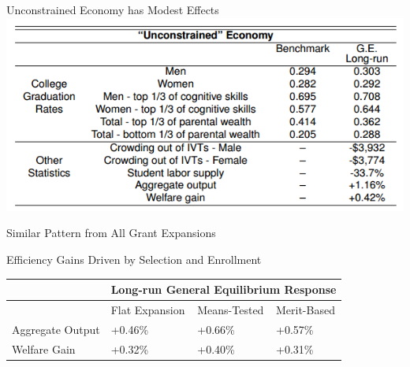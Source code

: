 \documentclass{beamer}
\begin{document}
\begin{frame}{Unconstrained Economy has Modest Effects}
\includegraphics[width=\textwidth]{unconstrained.png}
\end{frame}

\begin{frame}{Similar Pattern from All Grant Expansions}
\begin{table}[]
\centering
{}
\end{table}
\end{frame}

\begin{frame}{Efficiency Gains Driven by Selection and Enrollment}
\begin{table}[]
\centering
\begin{tabular}{|l|l|l|l|}
\hline
                 & \multicolumn{3}{l|}{Long-run General Equilibrium Response} \\ \hline
                 & Flat Expansion      & Means-Tested      & Merit-Based      \\ \hline
Aggregate Output & +0.46\%             & +0.66\%           & +0.57\%          \\ \hline
Welfare Gain     & +0.32\%             & +0.40\%           & +0.31\%          \\ \hline
\end{tabular}
\end{table}
\end{frame}
\end{document}
